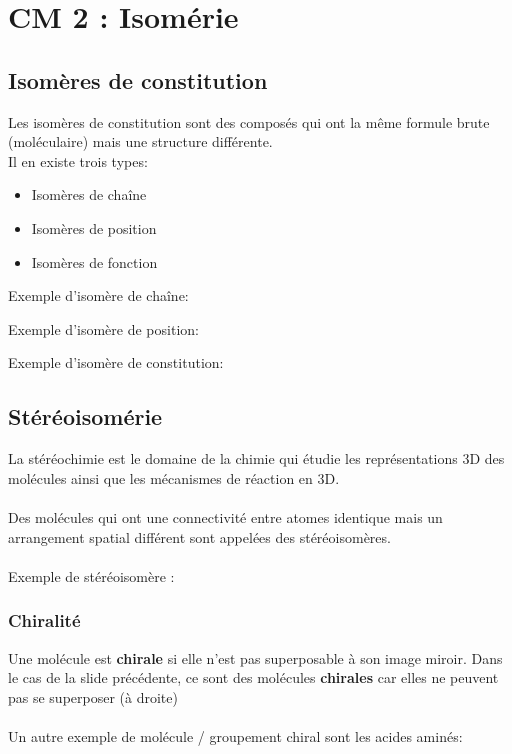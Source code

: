 \documentclass{article}
\newcommand{\insertslide}[2]{
\begin{center}
    \fbox{\texttt{[image: \#1]}}
\end{center}
}
\begin{document}
\section{CM 2 : Isomérie}
    \subsection{Isomères de constitution}
        Les isomères de constitution sont des composés qui ont
        la même formule brute (moléculaire) mais une structure
        différente.\\
        Il en existe trois types:
        \begin{itemize}
            \item Isomères de chaîne
            \item Isomères de position
            \item Isomères de fonction
        \end{itemize}
        Exemple d'isomère de chaîne:
        \insertslide{Slides/CM2.pdf}{3}
        Exemple d'isomère de position:
        \insertslide{Slides/CM2.pdf}{4}
        \pagebreak
        Exemple d'isomère de constitution:
        \insertslide{Slides/CM2.pdf}{5}

    \subsection{Stéréoisomérie}
        La stéréochimie est le domaine de la
        chimie qui étudie les représentations 3D
        des molécules ainsi que les mécanismes
        de réaction en 3D.\\\\
        Des molécules qui ont une connectivité
        entre atomes identique mais un
        arrangement spatial différent sont
        appelées des stéréoisomères.\\\\
        Exemple de stéréoisomère :
        \insertslide{Slides/CM2.pdf}{7}
\pagebreak
        \subsubsection{Chiralité}
            Une molécule est \textbf{chirale} si elle n'est pas
            superposable à son image miroir.
            Dans le cas de la slide précédente, ce sont des molécules \textbf{chirales}
            car elles ne peuvent pas se superposer (à droite)\\\\
            Un autre exemple de molécule / groupement chiral sont les acides aminés:\\
            \insertslide{Slides/CM2.pdf}{10}
\end{document}

